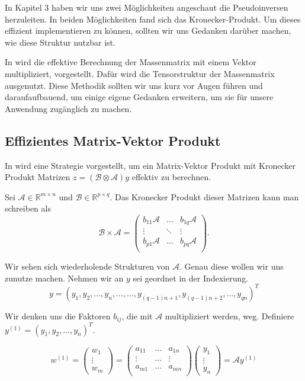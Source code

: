 In Kapitel 3 haben wir uns zwei Möglichkeiten angeschaut die Pseudoinversen herzuleiten. In beiden Möglichkeiten fand sich das Kronecker-Produkt.
Um dieses effizient implementieren zu können, sollten wir uns Gedanken darüber machen, wie diese Struktur nutzbar ist.

In \cite{Teachlet} wird die effektive Berechnung der Massenmatrix mit einem Vektor multipliziert, vorgestellt. Dafür wird die Tensorstruktur der Massenmatrix ausgenutzt. Diese Methodik sollten wir uns kurz vor Augen führen und daraufaufbauend, um einige eigene Gedanken erweitern, um sie für unsere Anwendung zugänglich zu machen.

\subsection{Effizientes Matrix-Vektor Produkt }
In \cite{Teachlet} wird eine Strategie vorgestellt, um ein Matrix-Vektor Produkt mit Kronecker Produkt Matrizen $z=(\mathcal{B} \otimes \mathcal{A})y$ effektiv zu berechnen.

Sei $\mathcal{A} \in \mathbb{R}^{m \times n}$ und $\mathcal{B} \in \mathbb{R}^{p \times q}$. Das Kronecker Produkt dieser Matrizen kann man schreiben als
\begin{equation*}
\mathcal{B} \times \mathcal{A} =
\begin{pmatrix}
b_{11}\mathcal{A} & \dots  & b_{1q}\mathcal{A} \\
\vdots & \ddots & \vdots \\
b_{p1}\mathcal{A} & \dots & b_{pq}\mathcal{A} \\
\end{pmatrix}.
\end{equation*}

Wir sehen sich wiederholende Strukturen von $\mathcal{A}$. Genau diese wollen wir uns zunutze machen. Nehmen wir an $y$ sei geordnet in der Indexierung.
\begin{equation*}
y = (y_1,y_2,\dots,y_n,\dots,\dots,y_{(q-1)n+1},y_{(q-1)n+2},\dots,y_{qn})^T
\end{equation*}

Wir denken uns die Faktoren $b_{ij}$, die mit $\mathcal{A}$ multipliziert werden, weg. Definiere $y^{(1)}=(y_1,y_2,\dots,y_n)^T$.

\begin{equation*}
w^{(1)}=
\begin{pmatrix}
w_1 \\ \vdots \\ w_m 
\end{pmatrix}
=
\begin{pmatrix}
a_{11} & \dots & a_{1n} \\
\vdots & \dots & \vdots \\
a_{m1} & \dots & a_{mn} \\
\end{pmatrix}
\begin{pmatrix}
y_1 \\ \vdots \\ y_n
\end{pmatrix}
= \mathcal{A}y^{(1)}
\end{equation*}

